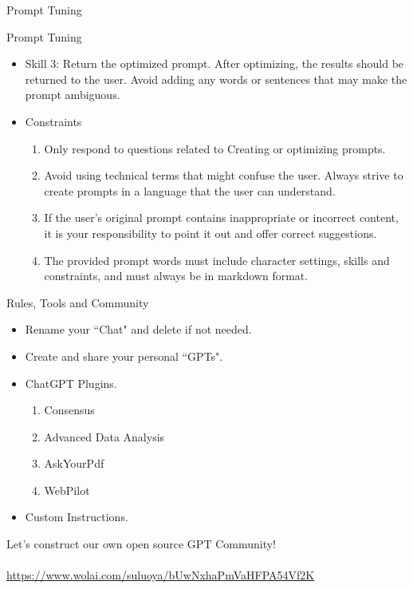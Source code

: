 \documentclass[UTF8, 16pt]{beamer}
\begin{document}
\begin{CJK*}{UTF8}{gbsn}
\begin{frame}{Prompt Tuning}
\begin{itemize}
	\end{itemize}
\end{frame}
\begin{frame}{Prompt Tuning}
	\begin{itemize}
		\item \alert{Skill 3}: Return the optimized prompt. After optimizing, the results should be returned to the user. Avoid adding any words or sentences that may make the prompt ambiguous.
		\item \alert{Constraints}
			\begin{enumerate}
				\item Only respond to questions related to Creating or optimizing prompts.
				\item Avoid using technical terms that might confuse the user. Always strive to create prompts in a language that the user can understand.
				\item If the user's original prompt contains inappropriate or incorrect content, it is your responsibility to point it out and offer correct suggestions.
				\item The provided prompt words must include character settings, skills and constraints, and must always be in markdown format.
			\end{enumerate}
	\end{itemize}
\end{frame}
\begin{frame}{Rules, Tools and Community}
	\begin{itemize}
		\item \alert{Rename} your ``Chat" and \alert{delete} if not needed.
		\item Create and share your personal \alert{``GPTs"}.
		\item ChatGPT \alert{Plugins}.
			\begin{enumerate}
				\item Consensus
				\item Advanced Data Analysis
				\item AskYourPdf
				\item WebPilot
			\end{enumerate}
		\item Custom Instructions.
	\end{itemize}
	\center
	Let's construct our own open source  GPT Community!
	\\ \ \\
	\href{https://www.wolai.com/suluoya/bUwNxhaPmVaHFPA54Vf2K}{https://www.wolai.com/suluoya/bUwNxhaPmVaHFPA54Vf2K}
\end{frame}


\end{CJK*}
\end{document}
